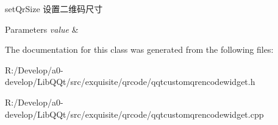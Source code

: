 set\+Qr\+Size 设置二维码尺寸 


\begin{DoxyParams}{Parameters}
{\em value} & \\
\hline
\end{DoxyParams}


The documentation for this class was generated from the following files\+:\begin{DoxyCompactItemize}
\item 
R\+:/\+Develop/a0-\/develop/\+Lib\+Q\+Qt/src/exquisite/qrcode/qqtcustomqrencodewidget.\+h\item 
R\+:/\+Develop/a0-\/develop/\+Lib\+Q\+Qt/src/exquisite/qrcode/qqtcustomqrencodewidget.\+cpp\end{DoxyCompactItemize}
